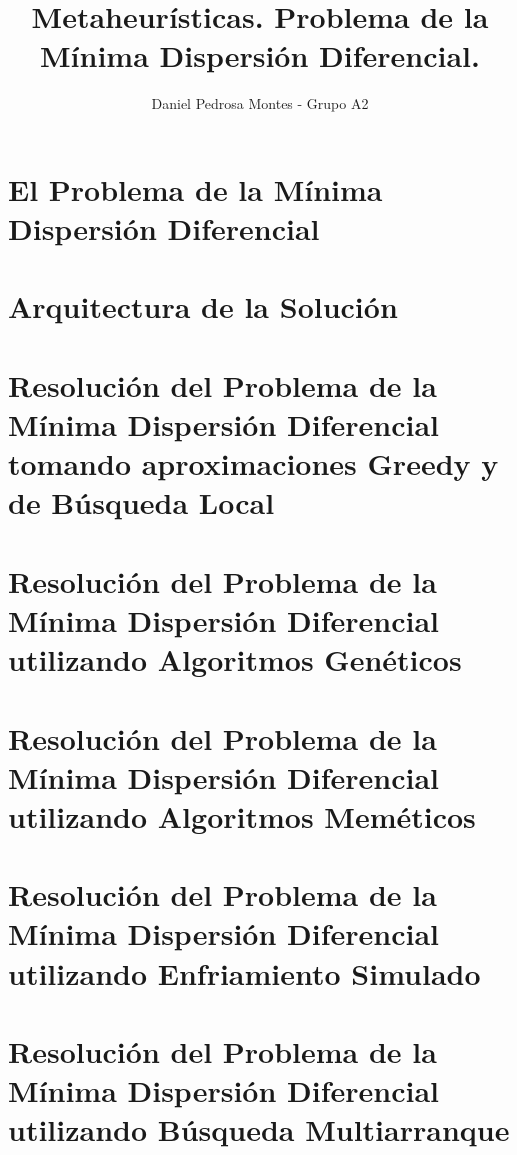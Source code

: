 \documentclass[10pt, a4paper]{aqademic}
\author{Daniel Pedrosa Montes - Grupo A2}
\title{Metaheurísticas. Problema de la Mínima Dispersión Diferencial.}
\begin{document}
\AqMaketitle[%
	cover    = identidad_ugr,
    dni      = {{DNI goes here}},
    email    = {{email goes here}},
	url      = https://github.com/moshidev/MH,
    date     = mayo del 2022
]

\tableofcontents

\chapter{El Problema de la Mínima Dispersión Diferencial}
    
    
\chapter{Arquitectura de la Solución}
    

\chapter{Resolución del Problema de la Mínima Dispersión Diferencial tomando aproximaciones Greedy y de Búsqueda Local}
    

\chapter{Resolución del Problema de la Mínima Dispersión Diferencial utilizando Algoritmos Genéticos}
    

\chapter{Resolución del Problema de la Mínima Dispersión Diferencial utilizando Algoritmos Meméticos}
    

\chapter{Resolución del Problema de la Mínima Dispersión Diferencial utilizando Enfriamiento Simulado}
    

\chapter{Resolución del Problema de la Mínima Dispersión Diferencial utilizando Búsqueda Multiarranque}
    
\end{document}
